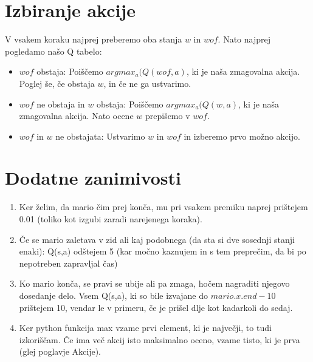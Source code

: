 \documentclass[a4paper,11pt]{article}
\begin{document}
\section{Izbiranje akcije}
V vsakem koraku najprej preberemo oba stanja $w$ in $wof$. Nato najprej pogledamo našo Q tabelo:
\begin{itemize}
\item{$wof$ obstaja:} Poiščemo $argmax_a(Q(wof, a)$, ki je naša zmagovalna akcija. Poglej še, če obstaja $w$, in če ne ga ustvarimo.
\item{$wof$ ne obstaja in $w$ obstaja:} Poiščemo $argmax_a(Q(w, a)$, ki je naša zmagovalna akcija. Nato ocene $w$ prepišemo v $wof$.
\item{$wof$ in $w$ ne obstajata:} Ustvarimo $w$ in $wof$ in izberemo prvo možno akcijo.
\end{itemize}

\section{Dodatne zanimivosti}
\begin{enumerate}
\item Ker želim, da mario čim prej konča, mu pri vsakem premiku naprej prištejem 0.01 (toliko kot izgubi zaradi narejenega koraka).
\item Če se mario zaletava v zid ali kaj podobnega (da sta si dve sosednji stanji enaki): Q(s,a) odštejem 5 (kar močno kaznujem in s tem preprečim, da bi po nepotreben zapravljal čas)
\item Ko mario konča, se pravi se ubije ali pa zmaga, hočem nagraditi njegovo dosedanje delo. Vsem Q(s,a), ki so bile izvajane do $mario.x.end - 10$ prištejem 10, vendar le v primeru, če je prišel dlje kot kadarkoli do sedaj.
\item Ker python funkcija max vzame prvi element, ki je največji, to tudi izkoriščam. Če ima več akcij isto maksimalno oceno, vzame tisto, ki je prva (glej poglavje Akcije).
\end{enumerate}
\end{document}
